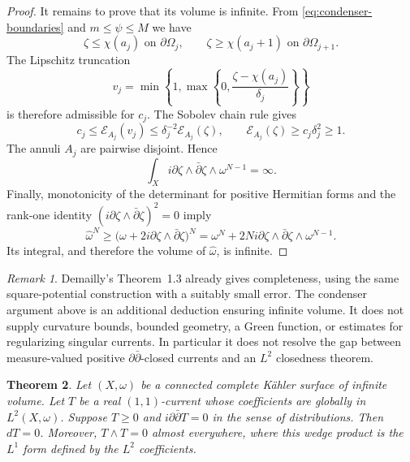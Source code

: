 \documentclass[11pt]{article}
\newtheorem{theorem}{Theorem}[section]
\theoremstyle{remark}
\newtheorem{remark}[theorem]{Remark}
\begin{document}
\begin{proof}
It remains to prove that its volume is infinite. From
\eqref{eq:condenser-boundaries} and $m\leq\psi\leq M$ we have
\[
 \zeta\leq\chi(a_j)\text{ on }\partial\Omega_j,
 \qquad
 \zeta\geq\chi(a_j+1)\text{ on }\partial\Omega_{j+1}.
\]
The Lipschitz truncation
\[
 v_j=\min\left\{1,\max\left\{0,
       \frac{\zeta-\chi(a_j)}{\delta_j}\right\}\right\}
\]
is therefore admissible for $c_j$. The Sobolev chain rule gives
\[
 c_j\leq\mathcal E_{A_j}(v_j)
 \leq\delta_j^{-2}\mathcal E_{A_j}(\zeta),
 \qquad
 \mathcal E_{A_j}(\zeta)\geq c_j\delta_j^2\geq1.
\]
The annuli $A_j$ are pairwise disjoint. Hence
\[
 \int_X i\partial\zeta\wedge\bar\partial\zeta
                      \wedge\omega^{N-1}=\infty.
\]
Finally, monotonicity of the determinant for positive Hermitian
forms and the rank-one identity
$(i\partial\zeta\wedge\bar\partial\zeta)^2=0$ imply
\[
 \widehat\omega^N
 \geq\bigl(\omega+2i\partial\zeta
                         \wedge\bar\partial\zeta\bigr)^N
 =\omega^N+2N i\partial\zeta\wedge\bar\partial\zeta
                                      \wedge\omega^{N-1}.
\]
Its integral, and therefore the volume of $\widehat\omega$,
is infinite.
\end{proof}

\begin{remark}
Demailly's Theorem~1.3 already gives completeness, using the
same square-potential construction with a suitably small error.
The condenser argument above is an additional deduction ensuring
infinite volume. It does not supply curvature bounds, bounded
geometry, a Green function, or estimates for regularizing
singular currents. In particular it does not resolve the gap
between measure-valued positive $\partial\bar\partial$-closed
currents and an $L^2$ closedness theorem.
\end{remark}




\begin{theorem}\label{thm:L2-closedness}
Let $(X,\omega)$ be a connected complete K\"ahler surface of infinite
volume. Let $T$ be a real $(1,1)$-current whose coefficients are globally
in $L^2(X,\omega)$. Suppose $T\geq0$ and $i\partial\bar\partial T=0$
in the sense of distributions. Then $dT=0$. Moreover, $T\wedge T=0$
almost everywhere, where this wedge product is the $L^1$ form defined
by the $L^2$ coefficients.
\end{theorem}
\end{document}

